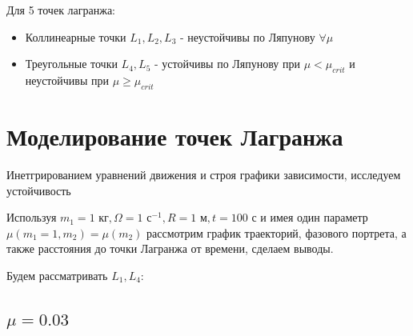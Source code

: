 \documentclass[12pt]{article}
\begin{document}
Для 5 точек лагранжа: 
\begin{itemize}
    \item Коллинеарные точки $L_1,L_2,L_3$ - неустойчивы по Ляпунову $\forall \mu$
    \item Треугольные точки $L_4, L_5$ - устойчивы по Ляпунову при $\mu<\mu_{crit}$ и неустойчивы при $\mu \geqslant \mu_{crit}$
\end{itemize}

\section{Моделирование точек Лагранжа}\label{sec:model}

Инетгрированием уравнений движения и строя графики зависимости, исследуем устойчивость

Используя $m_1=1 \text{ кг},\Omega = 1 \text{ с}^{-1}, R=1 \text{ м}, t = 100\text{ с}$ и имея один параметр $\mu(m_1=1,m_2) = \mu(m_2)$ рассмотрим график траекторий, фазового портрета, а также расстояния до точки Лагранжа от времени, сделаем выводы.

Будем рассматривать $L_1,L_4$:

\subsection{$\mu=0.03$}
\end{document}
